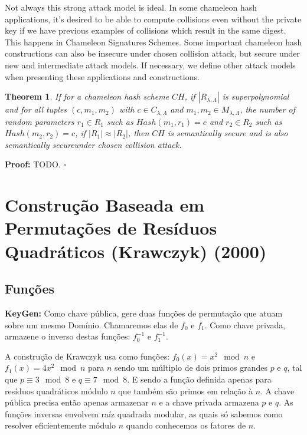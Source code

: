 \documentclass[a4paper]{article}
\newtheorem{theorem}{Theorem}
\newcommand*{\qed}{\hfill\ensuremath{\square}}
\begin{document}
 Not always this strong attack model is ideal. In some chameleon hash applications, it's desired to be able to compute collisions even without the private key if we have previous examples of collisions which result in the same digest. This happens in Chameleon Signatures Schemes. Some important chameleon hash constructions can also be insecure under chosen collision attack, but secure under new and intermediate attack models. If necessary, we define other attack models when presenting these applications and constructions.
 
 \begin{theorem}
 If for a chameleon hash scheme $CH$, if $|R_{\lambda, \Lambda}|$ is superpolynomial and for all tuples $(c, m_1, m_2)$ with $c \in C_{\lambda, \Lambda}$ and $m_1, m_2 \in M_{\lambda, \Lambda}$, the number of random parameters $r_1\in R_1$ such as $Hash(m_1, r_1)=c$ and $r_2\in R_2$ such as $Hash(m_2, r_2)=c$, if $|R_1| \approx |R_2|$, then $CH$ is semantically secure and is also semantically secureunder chosen collision attack. 
 \end{theorem}
 
 \textbf{Proof:} TODO. \qed
 
\section{Construção Baseada em Permutações de Resíduos Qua\-drá\-ti\-cos (Krawczyk) (2000) \cite{krawczyk}}

 \subsection{Funções}
 
 \textbf{KeyGen: }Como chave pública, gere duas funções de permutação
 que atuam sobre um mesmo Domínio. Chamaremos elas de $f_0$ e
 $f_1$. Como chave privada, armazene o inverso destas funções:
 $f_0^{-1}$ e $f_1^{-1}$.
 
 A construção de Krawczyk usa como funções: $f_0(x) = x^2 \mod n$ e
 $f_1(x) = 4x^2 \mod n$ para $n$ sendo um múltiplo de dois primos
 grandes $p$ e $q$, tal que $p \equiv 3 \mod 8$ e $q \equiv 7 \mod
 8$. E sendo a função definida apenas para resíduos quadráticos módulo
 $n$ que também são primos em relação à $n$. A chave pública precisa
 então apenas armazenar $n$ e a chave privada armazena $p$ e $q$. As
 funções inversas envolvem raíz quadrada modular, as quais só sabemos
 como resolver eficientemente módulo $n$ quando conhecemos os fatores
 de $n$.
 
\end{document}
